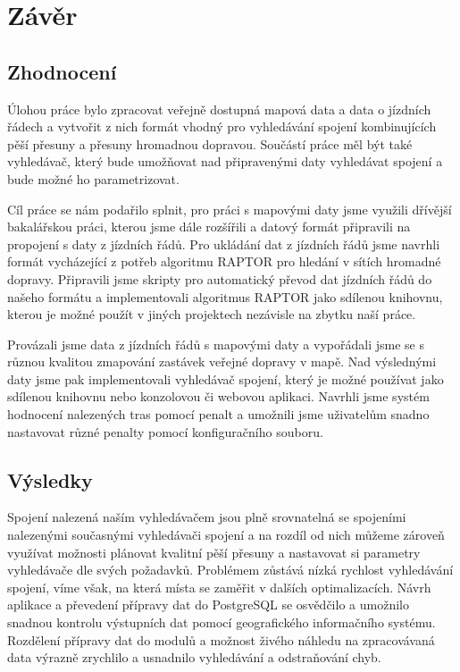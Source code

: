 \chapter{Závěr}

\section{Zhodnocení}
Úlohou práce bylo zpracovat veřejně dostupná mapová data a data o jízdních
řádech a vytvořit z nich formát vhodný pro vyhledávání spojení kombinujících
pěší přesuny a přesuny hromadnou dopravou. Součástí práce měl být také
vyhledávač, který bude umožňovat nad připravenými daty vyhledávat spojení a bude
možné ho parametrizovat.

Cíl práce se nám podařilo splnit, pro práci s mapovými daty jsme využili
dřívější bakalářskou práci, kterou jsme dále rozšířili a datový formát
připravili na propojení s daty z jízdních řádů. Pro ukládání dat z jízdních
řádů jsme navrhli formát vycházející z potřeb algoritmu RAPTOR pro hledání v
sítích hromadné dopravy. Připravili jsme skripty pro automatický převod dat
jízdních řádů do našeho formátu a implementovali algoritmus RAPTOR jako sdílenou
knihovnu, kterou je možné použít v jiných projektech nezávisle na zbytku naší
práce. 

Provázali jsme data z jízdních řádů s mapovými daty a vypořádali jsme se s
různou kvalitou zmapování zastávek veřejné dopravy v mapě. Nad výslednými daty
jsme pak implementovali vyhledávač spojení, který je možné používat jako
sdílenou knihovnu nebo konzolovou či webovou aplikaci. Navrhli jsme systém
hodnocení nalezených tras pomocí penalt a umožnili jsme uživatelům snadno
nastavovat různé penalty pomocí konfiguračního souboru. 

\section{Výsledky}
Spojení nalezená naším vyhledávačem jsou plně srovnatelná se spojeními
nalezenými současnými vyhledávači spojení a na rozdíl od nich můžeme zároveň
využívat možnosti plánovat kvalitní pěší přesuny a nastavovat si parametry
vyhledávače dle svých požadavků. Problémem zůstává nízká rychlost vyhledávání
spojení, víme však, na která místa se zaměřit v dalších optimalizacích. Návrh
aplikace a převedení přípravy dat do PostgreSQL se osvědčilo a umožnilo snadnou
kontrolu výstupních dat pomocí geografického informačního systému. Rozdělení
přípravy dat do modulů a možnost živého náhledu na zpracovávaná data výrazně
zrychlilo a usnadnilo vyhledávání a odstraňování chyb.


